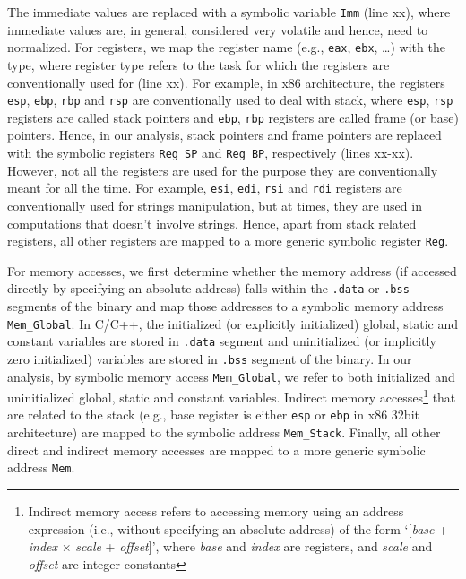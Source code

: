The immediate values are replaced with a symbolic variable \texttt{Imm} (line xx), where immediate values are, in general, considered very volatile and hence, need to normalized. For registers, we map the register name (e.g., \texttt{eax}, \texttt{ebx}, \ldots) with the type, where register type refers to the task for which the registers are conventionally used for (line xx). For example, in x86 architecture, the registers \texttt{esp}, \texttt{ebp}, \texttt{rbp} and \texttt{rsp} are conventionally used to deal with stack, where \texttt{esp}, \texttt{rsp} registers are called stack pointers and \texttt{ebp}, \texttt{rbp} registers are called frame (or base) pointers. Hence, in our analysis, stack pointers and frame pointers are replaced with the symbolic registers \texttt{Reg\_SP} and \texttt{Reg\_BP}, respectively (lines xx-xx). However, not all the registers are used for the purpose they are conventionally meant for all the time. For example, \texttt{esi}, \texttt{edi}, \texttt{rsi} and \texttt{rdi} registers are conventionally used for strings manipulation, but at times, they are used in computations that doesn't involve strings. Hence, apart from stack related registers, all other registers are mapped to a more generic symbolic register \texttt{Reg}.

For memory accesses, we first determine whether the memory address (if accessed directly by specifying an absolute address) falls within the \texttt{.data} or \texttt{.bss} segments of the binary and map those addresses to a symbolic memory address \texttt{Mem\_Global}. In C/C++, the initialized (or explicitly initialized) global, static and constant variables are stored in \texttt{.data} segment and uninitialized (or implicitly zero initialized) variables are stored in \texttt{.bss} segment  of the binary. In our analysis, by symbolic memory access \texttt{Mem\_Global}, we refer to both initialized and uninitialized global, static and constant variables. Indirect memory accesses\footnote{Indirect memory access refers to accessing memory using an address expression (i.e., without specifying an absolute address) of the form `[\textit{base} + \textit{index} $\times$ \textit{scale} + \textit{offset}]', where \textit{base} and \textit{index} are registers, and \textit{scale} and \textit{offset} are integer constants} that are related to the stack (e.g.,  base register is either \texttt{esp} or \texttt{ebp} in x86 32bit architecture) are mapped to the symbolic address \texttt{Mem\_Stack}. Finally, all other direct and indirect memory accesses are mapped to a more generic symbolic address \texttt{Mem}.

